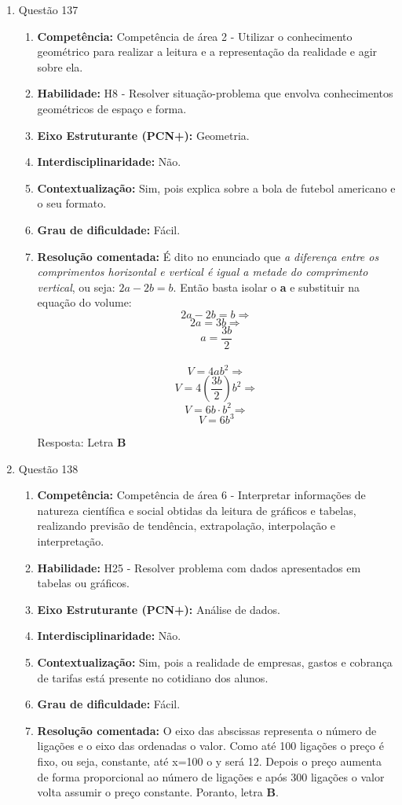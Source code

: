 \documentclass[a4paper, 12pt]{article}
\begin{document}
\begin{enumerate}
\begin{enumerate}
  \end{enumerate}
\item Questão 137
  \begin{enumerate}
  \item \textbf{Competência: }
    Competência de área 2 - Utilizar o conhecimento geométrico para realizar a leitura e a representação da realidade e agir sobre ela.
  \item \textbf{Habilidade: }
    H8 - Resolver situação-problema que envolva conhecimentos geométricos de espaço e forma.
  \item \textbf{Eixo Estruturante (PCN+): }
    Geometria.
  \item \textbf{Interdisciplinaridade: }
    Não.
  \item \textbf{Contextualização: }
    Sim, pois explica sobre a bola de futebol americano e o seu formato.
  \item \textbf{Grau de dificuldade: }
    Fácil.
  \item \textbf{Resolução comentada: }
    É dito no enunciado que \emph{a diferença entre os comprimentos horizontal e vertical é igual a metade do comprimento vertical}, ou seja: $2a-2b = b$. Então basta isolar o \textbf{a} e substituir na equação do volume:
    $$2a-2b = b \Rightarrow $$
    $$2a = 3b \Rightarrow $$
    $$a = \frac{3b}{2} $$\\
    
    $$V = 4ab^{2} \Rightarrow $$
    $$V = 4\left(\frac{3b}{2}\right)b^{2} \Rightarrow $$
    $$V = 6b \cdot b^{2} \Rightarrow $$
    $$\boxed{V = 6b^{3}} $$

    Resposta: Letra \textbf{B}
  \end{enumerate}  
\item Questão 138
  \begin{enumerate}
  \item \textbf{Competência: }
    Competência de área 6 - Interpretar informações de natureza científica e social obtidas da leitura de gráficos e tabelas, realizando previsão de tendência, extrapolação, interpolação e interpretação.
  \item \textbf{Habilidade: }
    H25 - Resolver problema com dados apresentados em tabelas ou gráficos.
  \item \textbf{Eixo Estruturante (PCN+): }
    Análise de dados.
  \item \textbf{Interdisciplinaridade: }
    Não.
  \item \textbf{Contextualização: }
    Sim, pois a realidade de empresas, gastos e cobrança de tarifas está presente no cotidiano dos alunos.
  \item \textbf{Grau de dificuldade: }
    Fácil.
  \item \textbf{Resolução comentada: }
    O eixo das abscissas representa o número de ligações e o eixo das ordenadas o valor. Como até 100 ligações o preço é fixo, ou seja, constante, até x=100 o y será 12. Depois o preço aumenta de forma proporcional ao número de ligações e após 300 ligações o valor volta assumir o preço constante. Poranto, letra \textbf{B}.
  \end{enumerate}  
\end{enumerate}
\end{document}
